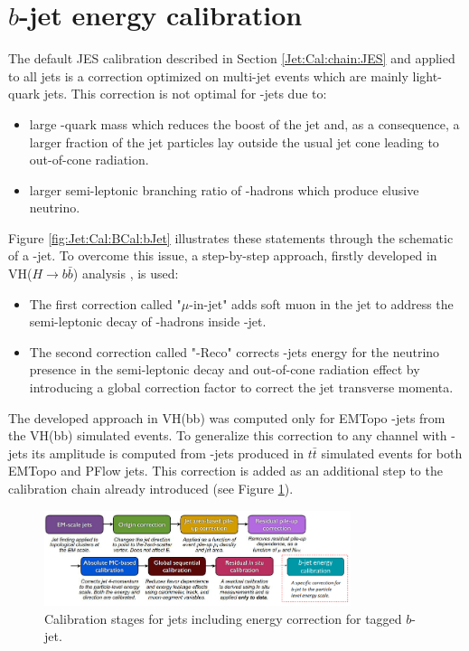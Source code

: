 \section{$b$-jet energy calibration}
\label{Jet:Cal:BCal}
The default JES calibration described in Section \ref{Jet:Cal:chain:JES} and applied to all jets is a correction optimized on multi-jet events which are mainly light-quark jets. This correction is not optimal for \bq-jets due to:
\begin{itemize}
    \item large \bq-quark mass which reduces the boost of the jet and, as a consequence, a larger fraction of the jet particles lay outside the usual jet cone leading to out-of-cone radiation.
    \item larger semi-leptonic branching ratio of \bq-hadrons which produce elusive neutrino.
\end{itemize}
Figure \ref{fig:Jet:Cal:BCal:bJet} illustrates these statements through the schematic of a \bq-jet. To overcome this issue, a step-by-step approach, firstly developed in VH($H\rightarrow b\bar{b}$) analysis \cite{Vhbb}, is used:
\begin{itemize}
    \item The first correction called "$\mu$-in-jet" adds soft muon in the jet to address the semi-leptonic decay of \bq-hadrons inside \bq-jet.
    \item The second correction called "\pT-Reco" corrects \bq-jets energy for the neutrino presence in the semi-leptonic decay and out-of-cone radiation effect by introducing a global correction factor to correct the jet transverse momenta.
\end{itemize}
 The developed approach in VH(bb) was computed only for EMTopo \bq-jets from the VH(bb) simulated events. To generalize this correction to any channel with \bq-jets its amplitude is computed from \bq-jets produced in $t\bar{t}$ simulated events for both EMTopo and PFlow jets. This correction is added as an additional step to the calibration chain already introduced (see Figure \ref{fig:Jet:Cal:BCal:Chain}).
\begin{figure}[htbp]
    \centering
    \includegraphics[width=0.8\textwidth]{Ch4/Img/b_jet_chain.png}
    \begin{tcolorbox}[colback=black!5!white,colframe=white!75!black]
    \caption{Calibration stages for jets including energy correction for tagged $b$-jet.}
    \label{fig:Jet:Cal:BCal:Chain}
    \end{tcolorbox}
\end{figure}
